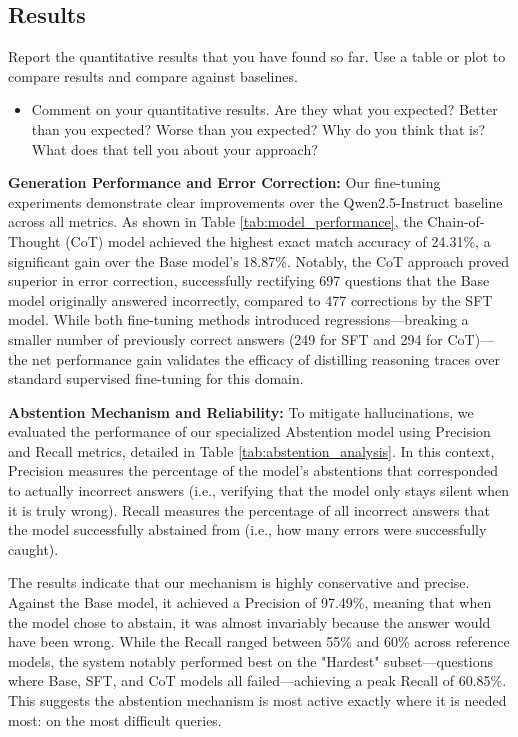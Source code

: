 \documentclass{article}
\begin{document}
\subsection{Results}
Report the quantitative results that you have found so far. Use a table or plot to compare results and compare against baselines.

\begin{itemize}
    \item Comment on your quantitative results. Are they what you expected? Better than you expected? Worse than you expected? Why do you think that is? What does that tell you about your approach?
\end{itemize}

\textbf{Generation Performance and Error Correction:} Our fine-tuning experiments demonstrate clear improvements over the Qwen2.5-Instruct baseline across all metrics. As shown in Table \ref{tab:model_performance}, the Chain-of-Thought (CoT) model achieved the highest exact match accuracy of 24.31\%, a significant gain over the Base model's 18.87\%. Notably, the CoT approach proved superior in error correction, successfully rectifying 697 questions that the Base model originally answered incorrectly, compared to 477 corrections by the SFT model. While both fine-tuning methods introduced regressions—breaking a smaller number of previously correct answers (249 for SFT and 294 for CoT)—the net performance gain validates the efficacy of distilling reasoning traces over standard supervised fine-tuning for this domain.

\textbf{Abstention Mechanism and Reliability:} To mitigate hallucinations, we evaluated the performance of our specialized Abstention model using Precision and Recall metrics, detailed in Table \ref{tab:abstention_analysis}. In this context, Precision measures the percentage of the model's abstentions that corresponded to actually incorrect answers (i.e., verifying that the model only stays silent when it is truly wrong). Recall measures the percentage of all incorrect answers that the model successfully abstained from (i.e., how many errors were successfully caught).

The results indicate that our mechanism is highly conservative and precise. Against the Base model, it achieved a Precision of 97.49\%, meaning that when the model chose to abstain, it was almost invariably because the answer would have been wrong. While the Recall ranged between 55\% and 60\% across reference models, the system notably performed best on the "Hardest" subset—questions where Base, SFT, and CoT models all failed—achieving a peak Recall of 60.85\%. This suggests the abstention mechanism is most active exactly where it is needed most: on the most difficult queries.
\end{document}

